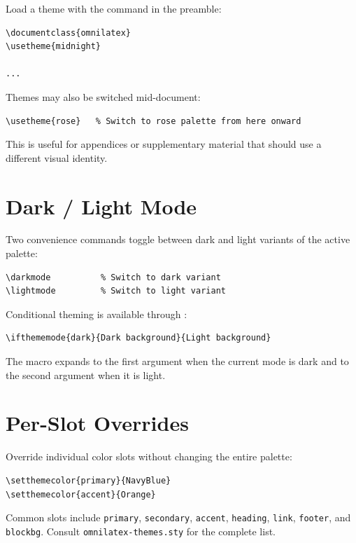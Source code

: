 Load a theme with the  command in the preamble:

\begin{verbatim}
\documentclass{omnilatex}
\usetheme{midnight}

...

\end{verbatim}

Themes may also be switched mid-document:

\begin{verbatim}
\usetheme{rose}   % Switch to rose palette from here onward
\end{verbatim}

This is useful for appendices or supplementary material that should use a
different visual identity.

\section{Dark / Light Mode}

Two convenience commands toggle between dark and light variants of the active
palette:

\begin{verbatim}
\darkmode          % Switch to dark variant
\lightmode         % Switch to light variant
\end{verbatim}

Conditional theming is available through :

\begin{verbatim}
\ifthememode{dark}{Dark background}{Light background}
\end{verbatim}

The macro expands to the first argument when the current mode is dark and to
the second argument when it is light.

\section{Per-Slot Overrides}

Override individual color slots without changing the entire palette:

\begin{verbatim}
\setthemecolor{primary}{NavyBlue}
\setthemecolor{accent}{Orange}
\end{verbatim}

Common slots include \texttt{primary}, \texttt{secondary}, \texttt{accent},
\texttt{heading}, \texttt{link}, \texttt{footer}, and \texttt{blockbg}.
Consult \texttt{omnilatex-themes.sty} for the complete list.

